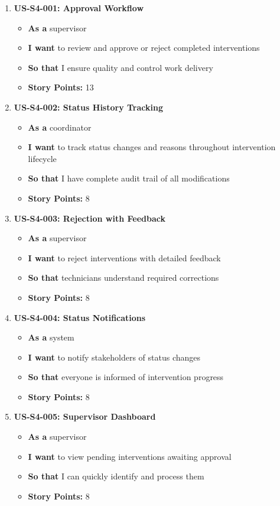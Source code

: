 \begin{enumerate}
\item \textbf{US-S4-001: Approval Workflow}
  \begin{itemize}
  \item \textbf{As a} supervisor
  \item \textbf{I want} to review and approve or reject completed interventions
  \item \textbf{So that} I ensure quality and control work delivery
  \item \textbf{Story Points:} 13
  \end{itemize}

\item \textbf{US-S4-002: Status History Tracking}
  \begin{itemize}
  \item \textbf{As a} coordinator
  \item \textbf{I want} to track status changes and reasons throughout intervention lifecycle
  \item \textbf{So that} I have complete audit trail of all modifications
  \item \textbf{Story Points:} 8
  \end{itemize}

\item \textbf{US-S4-003: Rejection with Feedback}
  \begin{itemize}
  \item \textbf{As a} supervisor
  \item \textbf{I want} to reject interventions with detailed feedback
  \item \textbf{So that} technicians understand required corrections
  \item \textbf{Story Points:} 8
  \end{itemize}

\item \textbf{US-S4-004: Status Notifications}
  \begin{itemize}
  \item \textbf{As a} system
  \item \textbf{I want} to notify stakeholders of status changes
  \item \textbf{So that} everyone is informed of intervention progress
  \item \textbf{Story Points:} 8
  \end{itemize}

\item \textbf{US-S4-005: Supervisor Dashboard}
  \begin{itemize}
  \item \textbf{As a} supervisor
  \item \textbf{I want} to view pending interventions awaiting approval
  \item \textbf{So that} I can quickly identify and process them
  \item \textbf{Story Points:} 8
  \end{itemize}
\end{enumerate}


